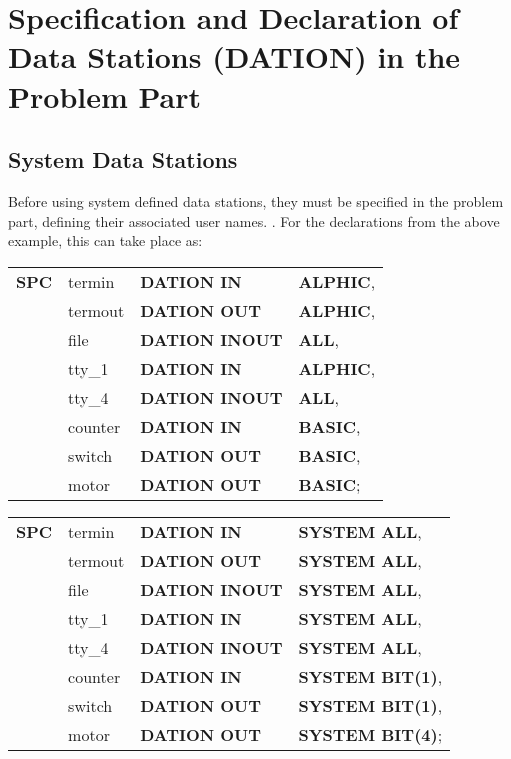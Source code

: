 \section{Specification and Declaration of Data Stations (DATION) in 
the Problem Part}   %
\label{sec_dation_problem_part}

\subsection{System Data Stations}   %

Before using system defined data stations, they must be specified in the
problem part, defining their associated user names. 
.
For the declarations from the above example, this can take place as:

\begin{removed}
\begin{tabular}{llll}
{\bf SPC} & termin  & {\bf DATION IN}    & {\bf ALPHIC},\\
   & termout & {\bf DATION OUT}   & {\bf ALPHIC},\\
   & file    & {\bf DATION INOUT} & {\bf ALL},   \\
   & tty\_1  & {\bf DATION IN}    & {\bf ALPHIC},\\
   & tty\_4  & {\bf DATION INOUT} & {\bf ALL},   \\
   & counter & {\bf DATION IN}    & {\bf BASIC}, \\
   & switch  & {\bf DATION OUT}   & {\bf BASIC}, \\
   & motor   & {\bf DATION OUT}   & {\bf BASIC}; \\
\end{tabular}
\end{removed}
\begin{added}
\begin{tabular}{llll}
{\bf SPC} & termin  & {\bf DATION IN}    & {\bf SYSTEM ALL},\\
   & termout & {\bf DATION OUT}   & {\bf SYSTEM ALL},\\
   & file    & {\bf DATION INOUT} & {\bf SYSTEM ALL},   \\
   & tty\_1  & {\bf DATION IN}    & {\bf SYSTEM ALL},\\
   & tty\_4  & {\bf DATION INOUT} & {\bf SYSTEM ALL},   \\
   & counter & {\bf DATION IN}    & {\bf SYSTEM BIT(1)}, \\
   & switch  & {\bf DATION OUT}   & {\bf SYSTEM BIT(1)}, \\
   & motor   & {\bf DATION OUT}   & {\bf SYSTEM BIT(4)}; \\
\end{tabular}
\end{added}

